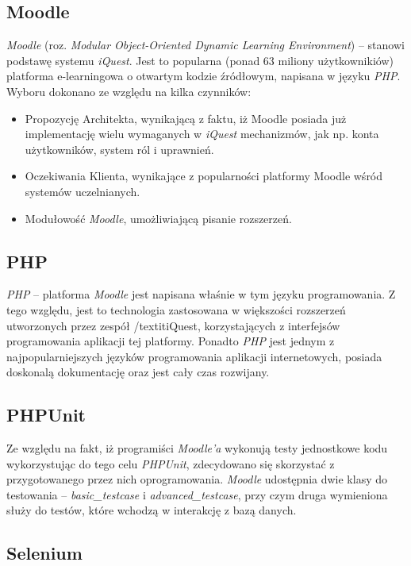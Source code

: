 \subsection{Moodle}
\label{Chapter631}

\emph{Moodle} (roz. \textit{Modular Object-Oriented Dynamic Learning Environment}) -- stanowi podstawę systemu \textit{iQuest}. Jest to popularna (ponad 63 miliony użytkownikiów) platforma e-learningowa o otwartym kodzie źródłowym, napisana w języku \emph{PHP}. Wyboru dokonano ze względu na kilka czynników:
\begin{itemize}
\item{Propozycję Architekta, wynikającą z faktu, iż Moodle posiada już implementację wielu wymaganych w \textit{iQuest} mechanizmów, jak np. konta użytkowników, system ról i uprawnień.}
\item{Oczekiwania Klienta, wynikające z popularności platformy Moodle wśród systemów uczelnianych.}
\item{Modułowość \emph{Moodle}, umożliwiającą pisanie rozszerzeń.}
\end{itemize}

\subsection{PHP}
\label{Chapter632}

\emph{PHP} -- platforma \textit{Moodle} jest napisana właśnie w tym języku programowania. Z tego względu, jest to technologia zastosowana w większości rozszerzeń utworzonych przez zespół /textit{iQuest}, korzystających z interfejsów programowania aplikacji tej platformy. Ponadto \emph{PHP} jest jednym z najpopularniejszych języków programowania aplikacji internetowych, posiada doskonalą dokumentację oraz jest cały czas rozwijany.

\subsection{PHPUnit}
\label{Chapter633}

Ze względu na fakt, iż programiści \textit{Moodle'a} wykonują testy jednostkowe kodu wykorzystując do tego celu \emph{PHPUnit}, zdecydowano się skorzystać z przygotowanego przez nich oprogramowania. \textit{Moodle} udostępnia dwie klasy do testowania -- \textit{basic\_testcase} i \textit{advanced\_testcase}, przy czym druga wymieniona służy do testów, które wchodzą w interakcję z bazą danych.

\subsection{Selenium}
\label{Chapter634}

